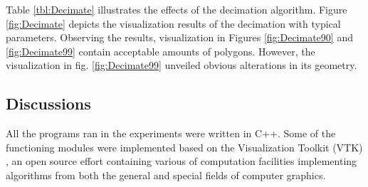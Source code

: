 Table \ref{tbl:Decimate} illustrates the effects of the decimation algorithm.
Figure \ref{fig:Decimate} depicts the visualization results of the decimation with typical parameters.
Observing the results, visualization in Figures \ref{fig:Decimate90} and \ref{fig:Decimate99} contain acceptable amounts of polygons.
However, the visualization in fig. \ref{fig:Decimate99} unveiled obvious alterations in its geometry.

\subsection{Discussions}

All the programs ran in the experiments were written in C++.
Some of the functioning modules were implemented based on the Visualization Toolkit (VTK) \cite{Schroeder2000VTK}, an open source effort containing various of computation facilities implementing algorithms from both the general and special fields of computer graphics. %

